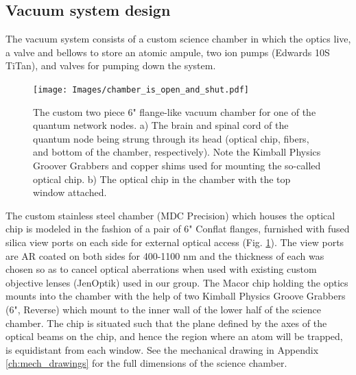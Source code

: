 \subsection{Vacuum system design}

The vacuum system consists of a custom science chamber in which the optics live, a valve and bellows to store an atomic ampule, two ion pumps (Edwards 10S TiTan), and valves for pumping down the system. 
\begin{figure}
    \centering
    \texttt{[image: Images/chamber\_is\_open\_and\_shut.pdf]}
    \caption{The custom two piece 6" flange-like vacuum chamber for one of the quantum network nodes. a) The brain and spinal cord of the quantum node being strung through its head (optical chip, fibers, and bottom of the chamber, respectively). Note the Kimball Physics Groover Grabbers and copper shims used for mounting the so-called optical chip. b) The optical chip in the chamber with the top window attached.}
    \label{fig:vacuum_chamber_imgs}
\end{figure}

The custom stainless steel chamber (MDC Precision) which houses the optical chip is modeled in the fashion of a pair of 6" Conflat flanges, furnished with fused silica view ports on each side for external optical access (Fig. \ref{fig:vacuum_chamber_imgs}). The view ports are AR coated on both sides for 400-1100 nm and the thickness of each was chosen so as to cancel optical aberrations when used with existing custom objective lenses (JenOptik) used in our group. The Macor chip holding the optics mounts into the chamber with the help of two Kimball Physics Groove Grabbers (6", Reverse) which mount to the inner wall of the lower half of the science chamber. The chip is situated such that the plane defined by the axes of the optical beams on the chip, and hence the region where an atom will be trapped, is equidistant from each window. See the mechanical drawing in Appendix \ref{ch:mech_drawings} for the full dimensions of the science chamber.


